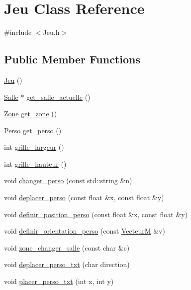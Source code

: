\hypertarget{classJeu}{}\section{Jeu Class Reference}
\label{classJeu}


{\ttfamily \#include $<$Jeu.\+h$>$}

\subsection*{Public Member Functions}
\begin{DoxyCompactItemize}
\item 
\hyperlink{classJeu_acc5795ee00edf75516d3dfe65be3e6d6}{Jeu} ()
\item 
\hyperlink{classSalle}{Salle} $\ast$ \hyperlink{classJeu_a2261f7e8b69c9b3c149c7544e3650d44}{get\+\_\+salle\+\_\+actuelle} ()
\item 
\hyperlink{classZone}{Zone} \hyperlink{classJeu_ad039e51fea7f4831f1f7461bdad20854}{get\+\_\+zone} ()
\item 
\hyperlink{classPerso}{Perso} \hyperlink{classJeu_a1a13f300078c5c38d402937f7bee40e5}{get\+\_\+perso} ()
\item 
int \hyperlink{classJeu_a431b8b7da233c1bfc0ea553b2ecb278b}{grille\+\_\+largeur} ()
\item 
int \hyperlink{classJeu_a2fe158a6437316b3f737927f643801d2}{grille\+\_\+hauteur} ()
\item 
void \hyperlink{classJeu_a86ed39a8b3d080a3e38f03034e9ce734}{changer\+\_\+perso} (const std\+::string \&n)
\item 
void \hyperlink{classJeu_af53414a64fbed782135517c6244baa19}{deplacer\+\_\+perso} (const float \&x, const float \&y)
\item 
void \hyperlink{classJeu_ad515ef604f0ca6eed7a48592e26213b8}{definir\+\_\+position\+\_\+perso} (const float \&x, const float \&y)
\item 
void \hyperlink{classJeu_a356c3f60c1fba1d16bce98013eefe443}{definir\+\_\+orientation\+\_\+perso} (const \hyperlink{classVecteurM}{VecteurM} \&v)
\item 
void \hyperlink{classJeu_a967e55cb872d8f570ad85dfc526692da}{zone\+\_\+changer\+\_\+salle} (const char \&c)
\item 
void \hyperlink{classJeu_a355402f932a5b99ee80c702948e632a5}{deplacer\+\_\+perso\+\_\+txt} (char direction)
\item 
void \hyperlink{classJeu_a56b2057832a6b7aa9535299131fb653e}{placer\+\_\+perso\+\_\+txt} (int x, int y)

\end{DoxyCompactItemize}
